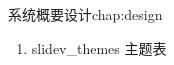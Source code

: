 \begin{cuzchapter}{系统概要设计}{chap:design}
\begin{enumerate}


    \item slidev\_themes 主题表


\end{enumerate}
\end{cuzchapter}
